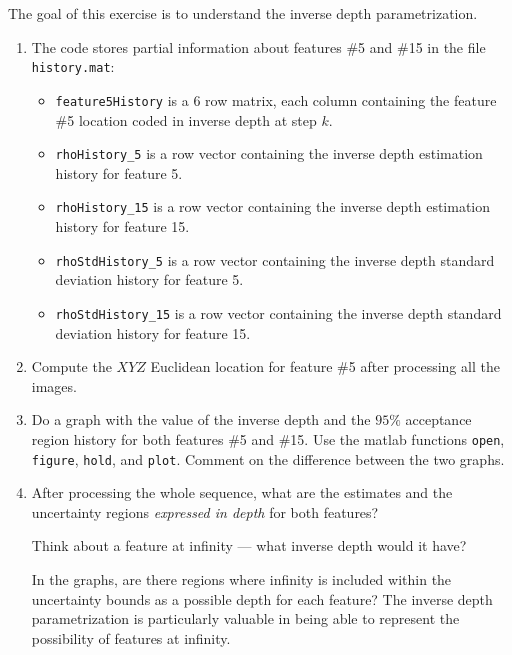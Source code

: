 \documentclass[a4paper,12pt]{article}
\begin{document}
The goal of this exercise is to understand the inverse depth
parametrization.
\begin{enumerate}
\item The code stores partial information about features \#5 and
\#15 in the file \texttt{history.mat}:

\begin{itemize}
\item \texttt{feature5History} is a 6 row matrix, each column containing the feature \#5
location coded in inverse depth at step $k$.
\item \texttt{rhoHistory\_5} is a row vector containing the inverse depth estimation
history for feature 5.
\item \texttt{rhoHistory\_15} is a row vector containing the inverse depth estimation
history for feature 15.
\item \texttt{rhoStdHistory\_5} is a row vector containing the inverse depth
standard deviation history for feature 5.
\item \texttt{rhoStdHistory\_15} is a row vector containing the inverse depth standard deviation
history for feature 15.
\end{itemize}

\item Compute the $XYZ$ Euclidean location for feature \#5 after
processing all the images.

\item Do a graph with the value of the inverse depth and the
  $95\%$ acceptance region history for both features \#5 and \#15.
  Use the matlab functions \texttt{open}, \texttt{figure}, \texttt{hold}, and \texttt{plot}.
  Comment on the difference between the two graphs.

\item After processing the whole sequence, what are the estimates and the
uncertainty regions \emph{expressed in depth} for both features?

Think about a feature at infinity ---  what inverse depth would it have?

In the graphs, are there regions where infinity is included within the
uncertainty bounds as a possible depth for each feature? The inverse
depth parametrization is particularly valuable in being able to
represent the possibility of features at infinity.


\end{enumerate}
\end{document}
